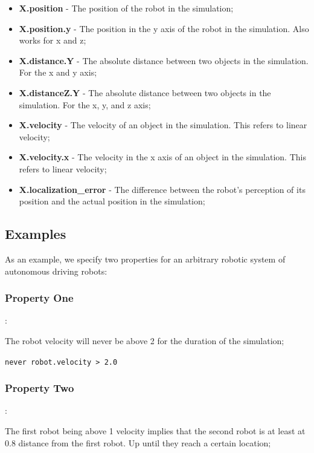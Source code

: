\documentclass[runningheads]{llncs}
\begin{document}
\begin{itemize}
\item {\bfseries X.position} - The position of the robot in the simulation;
\item {\bfseries X.position.y} - The position in the y axis of the robot in the simulation. Also works for x and z;
\item {\bfseries X.distance.Y} - The absolute distance between two objects in the simulation. For the x and y axis;
\item {\bfseries X.distanceZ.Y} - The absolute distance between two objects in the simulation. For the x, y, and z axis;
\item {\bfseries X.velocity} - The velocity of an object in the simulation. This refers to linear velocity;
\item {\bfseries X.velocity.x} - The velocity in the x axis of an object in the simulation. This refers to linear velocity;
\item {\bfseries X.localization\_error} - The difference between the robot's perception of its position and the actual position in the simulation;
\end{itemize}

\subsection{Examples}

As an example, we specify two properties for an arbitrary robotic system of autonomous driving robots:

\subsubsection{Property One}:

The robot velocity will never be above 2 for the duration of the simulation;

\vspace{3mm}

\texttt{never robot.velocity > 2.0}

\subsubsection{Property Two}:

The first robot being above 1 velocity implies that the second robot is at least at 0.8 distance from the first robot. Up until they reach a certain location;

\vspace{3mm}
\end{document}
